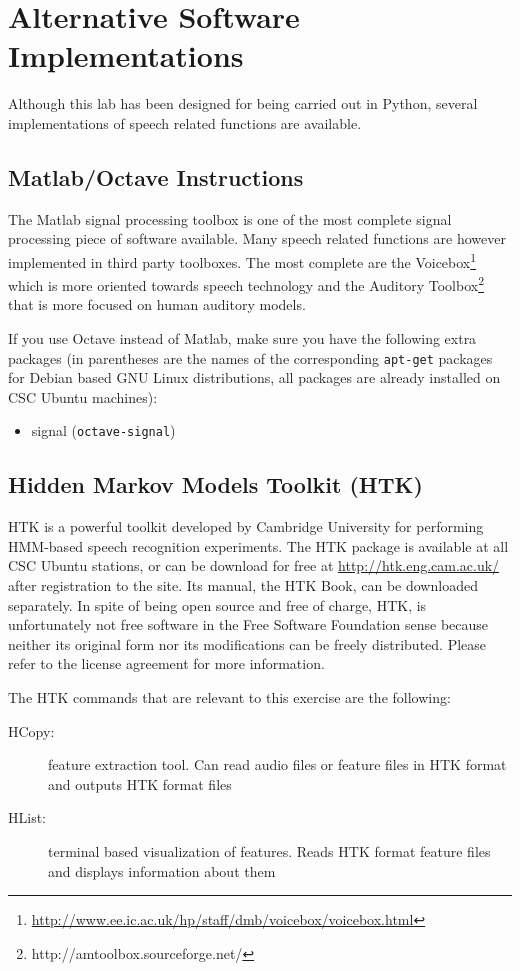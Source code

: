 \documentclass{nada-ten}
\begin{document}
\appendix
\newpage
\section{Alternative Software Implementations}
\label{sec:appendix}
Although this lab has been designed for being carried out in Python, several implementations of speech related functions are available.

\subsection{Matlab/Octave Instructions}
The Matlab signal processing toolbox is one of the most complete signal processing piece of software available. Many speech related functions are however implemented in third party toolboxes. The most complete are the Voicebox\footnote{\url{http://www.ee.ic.ac.uk/hp/staff/dmb/voicebox/voicebox.html}} which is more oriented towards speech technology and the Auditory Toolbox\footnote{http://amtoolbox.sourceforge.net/} that is more focused on human auditory models. 

If you use Octave instead of Matlab, make sure you have the following extra packages (in parentheses are the names of the corresponding \verb|apt-get| packages for Debian based GNU Linux distributions, all packages are already installed on CSC Ubuntu machines):
\begin{itemize}
\item signal (\verb|octave-signal|)
\end{itemize}

\subsection{Hidden Markov Models Toolkit (HTK)}
\label{sec:htkinstallation}
HTK is a powerful toolkit developed by Cambridge University for performing HMM-based speech recognition experiments. The HTK package is available at all CSC Ubuntu stations, or can be download for free at \url{http://htk.eng.cam.ac.uk/} after registration to the site. Its manual, the HTK Book, can be downloaded separately. In spite of being open source and free of charge, HTK, is unfortunately not free software in the Free Software Foundation sense because neither its original form nor its modifications can be freely distributed. Please refer to the license agreement for more information.

The HTK commands that are relevant to this exercise are the following:
\begin{description}
\item[HCopy:] feature extraction tool. Can read audio files or feature files in HTK format and outputs HTK format files
\item[HList:] terminal based visualization of features. Reads HTK format feature files and displays information about them
\end{description}
\end{document}
